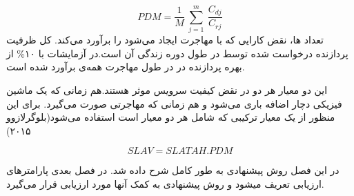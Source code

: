 \begin{equation}
PDM = \frac{1}{M}\:\sum_{j=1}^{m}\:\frac{C_{dj}}{C_{rj}}
\label{f6}
\end{equation}
   تعداد
  ‌ها، 
    نقض کارایی 
    که با مهاجرت ایجاد می‌شود را برآورد می‌کند.
    کل ظرفیت پردازنده درخواست شده 
    توسط
          در طول دوره زندگی آن است.در آزمایشات 
      با 
      ۱۰\%
        از بهره پردازنده در
     در طول مهاجرت همه‌ی
     برآورد شده است.
     
   این دو معیار هر دو در نقض کیفیت سرویس موثر هستند.هم زمانی که یک ماشین فیزیکی دچار اضافه باری می‌شود و هم زمانی که مهاجرتی صورت می‌گیرد. برای این منظور از یک معیار ترکیبی که شامل هر دو معیار است استفاده می‌شود(بلوگرلازوو ۲۰۱۵)

\begin{equation}
   SLAV = SLATAH.PDM
\end{equation}
   
   در این فصل روش پیشنهادی به طور کامل شرح داده شد. در فصل بعدی پارامترهای ارزیابی تعریف می­شود و روش پیشنهادی به کمک آنها مورد ارزیابی قرار می‌گیرد.
